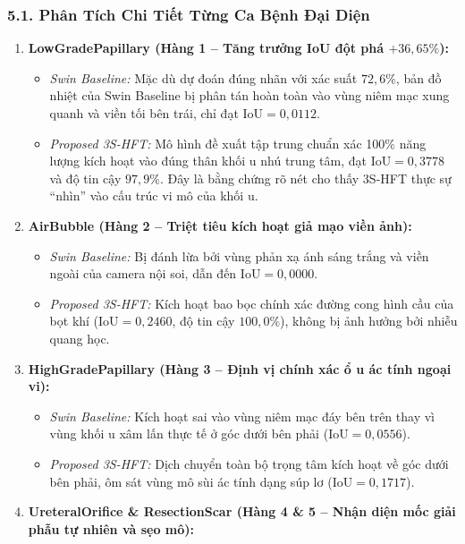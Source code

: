\documentclass[
  11pt,
  a4paper,
]{article}
\providecommand{\tightlist}{%
  \setlength{\itemsep}{0pt}\setlength{\parskip}{0pt}}
\begin{document}
\subsubsection{5.1. Phân Tích Chi Tiết Từng Ca Bệnh Đại
Diện}\label{phuxe2n-tuxedch-chi-tiux1ebft-tux1eebng-ca-bux1ec7nh-ux111ux1ea1i-diux1ec7n}

\begin{enumerate}
\def\labelenumi{\arabic{enumi}.}
\tightlist
\item
  \textbf{LowGradePapillary (Hàng 1 -- Tăng trưởng IoU đột phá
  \(+36{,}65\%\)):}

  \begin{itemize}
  \tightlist
  \item
    \emph{Swin Baseline:} Mặc dù dự đoán đúng nhãn với xác suất
    \(72{,}6\%\), bản đồ nhiệt của Swin Baseline bị phân tán hoàn toàn
    vào vùng niêm mạc xung quanh và viền tối bên trái, chỉ đạt
    \(\text{IoU} = 0{,}0112\).
  \item
    \emph{Proposed 3S-HFT:} Mô hình đề xuất tập trung chuẩn xác 100\%
    năng lượng kích hoạt vào đúng thân khối u nhú trung tâm, đạt
    \(\text{IoU} = 0{,}3778\) và độ tin cậy \(97{,}9\%\). Đây là bằng
    chứng rõ nét cho thấy 3S-HFT thực sự ``nhìn'' vào cấu trúc vi mô của
    khối u.
  \end{itemize}
\item
  \textbf{AirBubble (Hàng 2 -- Triệt tiêu kích hoạt giả mạo viền ảnh):}

  \begin{itemize}
  \tightlist
  \item
    \emph{Swin Baseline:} Bị đánh lừa bởi vùng phản xạ ánh sáng trắng và
    viền ngoài của camera nội soi, dẫn đến \(\text{IoU} = 0{,}0000\).
  \item
    \emph{Proposed 3S-HFT:} Kích hoạt bao bọc chính xác đường cong hình
    cầu của bọt khí (\(\text{IoU} = 0{,}2460\), độ tin cậy
    \(100{,}0\%\)), không bị ảnh hưởng bởi nhiễu quang học.
  \end{itemize}
\item
  \textbf{HighGradePapillary (Hàng 3 -- Định vị chính xác ổ u ác tính
  ngoại vi):}

  \begin{itemize}
  \tightlist
  \item
    \emph{Swin Baseline:} Kích hoạt sai vào vùng niêm mạc đáy bên trên
    thay vì vùng khối u xâm lấn thực tế ở góc dưới bên phải
    (\(\text{IoU} = 0{,}0556\)).
  \item
    \emph{Proposed 3S-HFT:} Dịch chuyển toàn bộ trọng tâm kích hoạt về
    góc dưới bên phải, ôm sát vùng mô sùi ác tính dạng súp lơ
    (\(\text{IoU} = 0{,}1717\)).
  \end{itemize}
\item
  \textbf{UreteralOrifice \& ResectionScar (Hàng 4 \& 5 -- Nhận diện mốc
  giải phẫu tự nhiên và sẹo mô):}


\end{enumerate}
\end{document}
